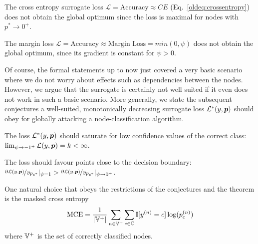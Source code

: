\documentclass[sigconf,authordraft]{acmart}
\begin{document}
\begin{corollary}\label{oldcorollary:ce}
  The cross entropy surrogate loss \(\mathcal{L} = \text{Accuracy} \approx CE\) (Eq.~\ref{oldeq:crossentropy}) does not obtain the global optimum since the loss is maximal for nodes with \(p^* \to 0^+\).
\end{corollary}

\begin{corollary}\label{oldcorollary:margin}
  The margin loss \(\mathcal{L} = \text{Accuracy} \approx \text{Margin Loss} = min(0, \psi)\) does not obtain the global optimum, since its gradient is constant for \(\psi > 0\).
\end{corollary}

Of course, the formal statements up to now just covered a very basic scenario where we do not worry about effects such as dependencies between the nodes. However, we argue that the surrogate is certainly not well suited if it even does not work in such a basic scenario. More generally, we state the subsequent conjectures a well-suited, monotonically decreasing surrogate loss \(\mathcal{L^*}(y, {\bm{p}})\) should obey for globally attacking a node-classification algorithm.
\begin{conjecture}\label{oldconjecture:conjecture1}
  The loss \(\mathcal{L^*}(y, {\bm{p}})\) should saturate for low confidence values of the correct class: \(\lim_{\psi \to -1^+} \mathcal{L}(y, {\bm{p}}) = k < \infty\).
\end{conjecture}
\begin{conjecture}\label{oldconjecture:conjecture2}
  The loss should favour points close to the decision boundary: \(\nicefrac{\partial \mathcal{L}(y, {\bm{p}})}{\partial {p}_{c^*}} |_{\psi = 1}  > \nicefrac{\partial \mathcal{L}(y, {\bm{p}})}{\partial {p}_{c^*}} |_{\psi \to 0^+}\).
\end{conjecture}

One natural choice that obeys the restrictions of the conjectures and the theorem is the masked cross entropy
\begin{equation}\label{oldeq:mce}
  \text{MCE} = \frac{1}{|{\mathbb{V}}^+|} \sum_{n \in {\mathbb{V}}^+} \sum_{c \in {\mathbb{C}}} \mathbb{I}[y^{(n)} = c] \log({p}_{c}^{(n)})
\end{equation}
where \({\mathbb{V}}^+\) is the set of correctly classified nodes. %
\end{document}
